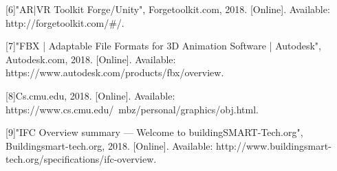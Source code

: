 \documentclass[onecolumn, draftclsnofoot,10pt, compsoc]{IEEEtran}
\begin{document}
[6]"AR|VR Toolkit Forge/Unity", Forgetoolkit.com, 2018. [Online]. Available: http://forgetoolkit.com/\#/.

[7]"FBX | Adaptable File Formats for 3D Animation Software | Autodesk", Autodesk.com, 2018. [Online]. Available: https://www.autodesk.com/products/fbx/overview.

[8]Cs.cmu.edu, 2018. [Online]. Available: https://www.cs.cmu.edu/~mbz/personal/graphics/obj.html.

[9]"IFC Overview summary — Welcome to buildingSMART-Tech.org", Buildingsmart-tech.org, 2018. [Online]. Available: http://www.buildingsmart-tech.org/specifications/ifc-overview. 
\end{document}

